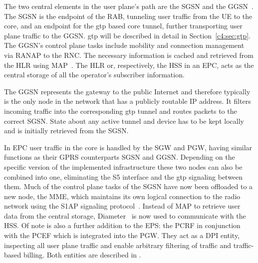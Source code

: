 The two central elements in the user plane's path are the \gls{SGSN} and the \gls{GGSN}~\cite{3gpp.22.060,3gpp.23.060}. The \gls{SGSN} is the endpoint of the \gls{RAB}, tunneling user traffic from the \gls{UE} to the core, and an endpoint for the \gls{gtp} based core tunnel, further transporting user plane traffic to the \gls{GGSN}. \Gls{gtp} will be described in detail in Section~\ref{c4:sec:gtp}. The \gls{GGSN}'s control plane tasks include mobility and connection management via \gls{RANAP} to the \gls{RNC}. The necessary information is cached and retrieved from the \gls{HLR} using \gls{MAP}~\cite{3gpp.29.002}. The \gls{HLR} or, respectively, the \gls{HSS} in an \gls{EPC}, acts as the central storage of all the operator's subscriber information.

The \gls{GGSN} represents the gateway to the public Internet and therefore typically is the only node in the network that has a publicly routable \gls{IP} address. It filters incoming traffic into the corresponding \gls{gtp} tunnel and routes packets to the correct \gls{SGSN}. State about any active tunnel and device has to be kept locally and is initially retrieved from the \gls{SGSN}.

In \gls{EPC} user traffic in the core is handled by the \gls{SGW} and \gls{PGW}, having similar functions as their \gls{GPRS} counterparts \gls{SGSN} and \gls{GGSN}. Depending on the specific version of the implemented infrastructure these two nodes can also be combined into one, eliminating the S5 interface and the \gls{gtp} signaling between them. Much of the control plane tasks of the \gls{SGSN} have now been offloaded to a new node, the \gls{MME}, which maintains its own logical connection to the radio network using the \gls{S1AP} signaling protocol~\cite{3gpp.36.413}. Instead of \gls{MAP} to retrieve user data from the central storage, Diameter~\cite{rfc6733} is now used to communicate with the \gls{HSS}. Of note is also a further addition to the \gls{EPS}: the \gls{PCRF} in conjunction with the \gls{PCEF} which is integrated into the \gls{PGW}. They act as a \gls{DPI} entity, inspecting all user plane traffic and enable arbitrary filtering of traffic and traffic-based billing. Both entities are described in \cite{3gpp.23.203}.

